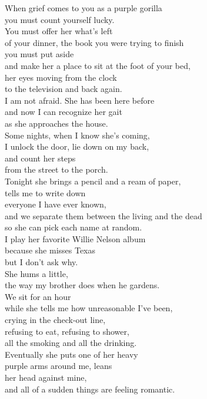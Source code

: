 \documentclass[10pt]{memoir}
\begin{document}
\begin{multicols}{2}
{
When grief comes to you as a purple gorilla\\
you must count yourself lucky.\\
You must offer her what's left\\
of your dinner, the book you were trying to finish\\
you must put aside\\
and make her a place to sit at the foot of your bed,\\
her eyes moving from the clock\\
to the television and back again.\\
I am not afraid. She has been here before\\
and now I can recognize her gait\\
as she approaches the house.\\
Some nights, when I know she's coming,\\
I unlock the door, lie down on my back,\\
and count her steps\\
from the street to the porch.\\
Tonight she brings a pencil and a ream of paper,\\
tells me to write down\\
everyone I have ever known,\\
and we separate them between the living and the dead\\
so she can pick each name at random.\\
I play her favorite Willie Nelson album\\
because she misses Texas\\
but I don't ask why.\\
She hums a little,\\
the way my brother does when he gardens.\\
We sit for an hour\\
while she tells me how unreasonable I've been,\\
crying in the check-out line,\\
refusing to eat, refusing to shower,\\
all the smoking and all the drinking.\\
Eventually she puts one of her heavy\\
purple arms around me, leans\\
her head against mine,\\
and all of a sudden things are feeling romantic.\\
}
\end{multicols}
\end{document}
